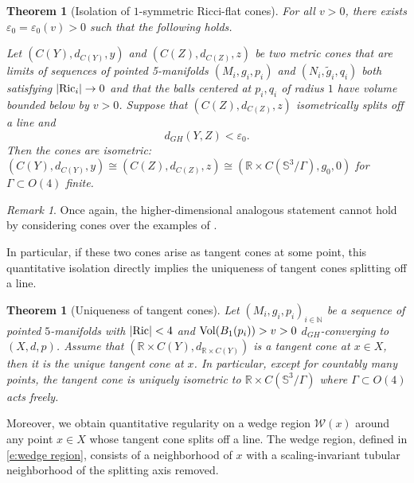 \documentclass[11pt,reqno]{amsart}
\numberwithin{equation}{section}
\newcommand{\RR}{\mathds{R}}
\newcommand{\Ric}{{\rm Ric}}
\newcommand{\Vol}{{\rm Vol}}
\newcommand{\cW}{\mathcal{W}}
\newtheorem{theorem}[thm]{Theorem}
\theoremstyle{definition}
\theoremstyle{remark}
\newtheorem{remark}[thm]{Remark}
\begin{document}
\begin{theorem}[Isolation of $1$-symmetric Ricci-flat cones]\label{thm:isolation 1sym}
For all $v>0$, there exists $\varepsilon_0 = \varepsilon_0(v)>0$ such that the following holds.

Let $(C(Y),d_{C(Y)},y)$ and $(C(Z),d_{C(Z)},z)$ be two metric cones that are limits of sequences of pointed 5-manifolds $(M_i,g_i,p_i)$ and $(N_i,\tilde{g}_i,q_i)$ both satisfying $|\Ric_i| \to 0$ and that the balls centered at $p_i, q_i$ of radius $1$ have volume bounded below by $v>0$. Suppose that $(C(Z),d_{C(Z)},z)$ isometrically splits off a line and 
\begin{equation*}
    d_{GH}(Y,Z) < \varepsilon_0.
\end{equation*}
Then the cones are isometric: $(C(Y),d_{C(Y)},y) \cong (C(Z),d_{C(Z)},z) \cong (\RR \times C(\mathbb{S}^3/\Gamma), g_0, 0)$ for $\Gamma \subset O(4)$ finite. 




\end{theorem}
\begin{remark}
    Once again, the higher-dimensional analogous statement cannot hold by considering cones over the examples of \cite{boh}. 
\end{remark}

In particular, if these two cones arise as tangent cones at some point, this quantitative isolation directly implies the uniqueness of tangent cones splitting off a line.

\begin{theorem}[Uniqueness of tangent cones]\label{t:local uniqueness}
    Let $(M_i,g_i, p_i)_{i\in\mathbb{N}}$ be a sequence of pointed $5$-manifolds with $|\Ric|< 4$ and $\Vol(B_1(p_i)) > v >0$ $d_{GH}$-converging to $(X,d,p)$. Assume that $(\mathbb{R}\times C(Y),d_{\mathbb{R}\times C(Y)})$ is a tangent cone at $x\in X$, then it is the \emph{unique} tangent cone at $x$. In particular, except for countably many points, the tangent cone is uniquely isometric to $\RR \times C(\mathbb{S}^3/\Gamma)$ where $\Gamma \subset O(4)$ acts freely. 
\end{theorem}


Moreover, we obtain quantitative regularity on a wedge region $\cW(x)$ around any point $x \in X$ whose tangent cone splits off a line.  
The wedge region, defined in \eqref{e:wedge region}, consists of a neighborhood of $x$ with a scaling-invariant tubular neighborhood of the splitting axis removed.
\end{document}
